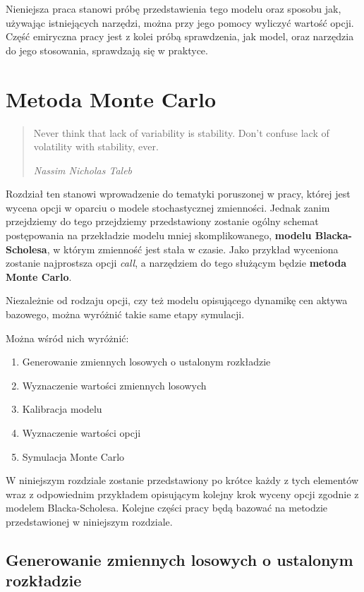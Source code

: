 \documentclass{pracamgr}
\begin{document}
Nieniejsza praca stanowi próbę przedstawienia tego modelu oraz sposobu jak, używając istniejących narzędzi,
można przy jego pomocy wyliczyć wartość opcji. Część emiryczna pracy jest z kolei próbą sprawdzenia, jak 
model, oraz narzędzia do jego stosowania, sprawdzają się w praktyce.


\chapter{Metoda Monte Carlo}
\label{chap:introduction}

\begin{quote}

Never think that lack of variability is stability. Don't confuse lack of volatility with stability, ever.
 
\raggedleft\slshape Nassim Nicholas Taleb 
\end{quote}
 

Rozdział ten stanowi wprowadzenie do tematyki poruszonej w pracy, której jest wycena opcji w oparciu
o modele stochastycznej zmienności. 
Jednak zanim przejdziemy do tego przejdziemy przedstawiony zostanie ogólny schemat postępowania na
przekładzie modelu mniej skomplikowanego, \textbf{modelu Blacka-Scholesa}, w którym zmienność jest stała w czasie.
Jako przykład wyceniona zostanie najprostsza opcji \textit{call}, a narzędziem do tego służącym 
będzie \textbf{metoda Monte Carlo}.

Niezależnie od rodzaju opcji, czy też modelu opisującego dynamikę cen aktywa bazowego, można 
wyróżnić takie same etapy symulacji. 

Można wśród nich wyróżnić:
\begin{enumerate}
  \item Generowanie zmiennych losowych o ustalonym rozkładzie
  \item Wyznaczenie wartości zmiennych losowych
  \item Kalibracja modelu
  \item Wyznaczenie wartości opcji
  \item Symulacja Monte Carlo
\end{enumerate}

W niniejszym rozdziale zostanie przedstawiony po krótce każdy z tych elementów wraz z odpowiednim przykładem opisującym kolejny krok wyceny opcji zgodnie z modelem Blacka-Scholesa.
Kolejne części pracy będą bazować na metodzie przedstawionej w niniejszym rozdziale.

\section{Generowanie zmiennych losowych o ustalonym rozkładzie}
\end{document}
